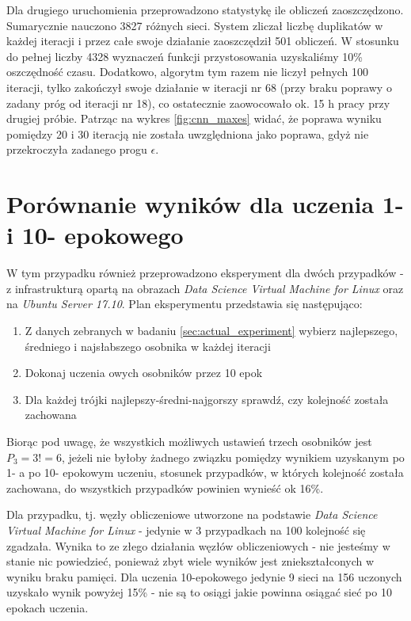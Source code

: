 Dla drugiego uruchomienia przeprowadzono statystykę ile obliczeń zaoszczędzono.
Sumarycznie nauczono 3827 różnych sieci.
System zliczał liczbę duplikatów w każdej iteracji i przez całe swoje działanie zaoszczędził 501 obliczeń.
W stosunku do pełnej liczby 4328 wyznaczeń funkcji przystosowania uzyskaliśmy 10\% oszczędność czasu.
Dodatkowo, algorytm tym razem nie liczył pełnych 100 iteracji, tylko zakończył swoje działanie w iteracji nr 68 (przy braku poprawy o zadany próg od iteracji nr 18), co ostatecznie zaowocowało ok. 15 h pracy przy drugiej próbie.
Patrząc na wykres \ref{fig:cnn_maxes} widać, że poprawa wyniku pomiędzy 20 i 30 iteracją nie została uwzględniona jako poprawa, gdyż nie przekroczyła zadanego progu $\epsilon$.

\section{Porównanie wyników dla uczenia 1- i 10- epokowego}\label{sec:thesis_proof}
W tym przypadku również przeprowadzono eksperyment dla dwóch przypadków - z infrastrukturą opartą na obrazach \textit{Data Science Virtual Machine for Linux} oraz na \textit{Ubuntu Server 17.10}.
Plan eksperymentu przedstawia się następująco:
\begin{enumerate}
  \item Z danych zebranych w badaniu \ref{sec:actual_experiment} wybierz najlepszego, średniego i najsłabszego osobnika w każdej iteracji
  \item Dokonaj uczenia owych osobników przez 10 epok
  \item Dla każdej trójki najlepszy-średni-najgorszy sprawdź, czy kolejność została zachowana
\end{enumerate}

Biorąc pod uwagę, że wszystkich możliwych ustawień trzech osobników jest $P_3 = 3! = 6$, jeżeli nie byłoby żadnego związku pomiędzy wynikiem uzyskanym po 1- a po 10- epokowym uczeniu, stosunek przypadków, w których kolejność została zachowana, do wszystkich przypadków powinien wynieść ok 16\%.

Dla przypadku, tj. węzły obliczeniowe utworzone na podstawie \textit{Data Science Virtual Machine for Linux} - jedynie w 3 przypadkach na 100 kolejność się zgadzała. Wynika to ze złego działania węzłów obliczeniowych - nie jesteśmy w stanie nic powiedzieć, ponieważ zbyt wiele wyników jest zniekształconych w wyniku braku pamięci.
Dla uczenia 10-epokowego jedynie 9 sieci na 156 uczonych uzyskało wynik powyżej 15\% - nie są to osiągi jakie powinna osiągać sieć po 10 epokach uczenia.

